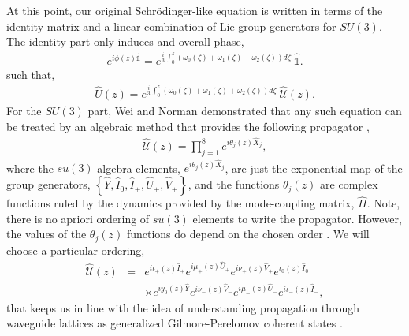 \documentclass[9pt,twocolumn,twoside]{osajnl}
\begin{document}
At this point, our original Schr\"odinger-like equation is written in terms of the identity matrix and a linear combination of Lie group generators for $SU(3)$.
The identity part only induces and overall phase,
\begin{eqnarray}
e^{i \phi(z) \hat{\mathbb{1}}} = e^{\frac{i}{3} \int_{0}^{z} \left(\omega_{0}(\zeta) + \omega_{1}(\zeta) + \omega_{2}(\zeta) \right) d\zeta } ~\hat{\mathbb{1}} .
\end{eqnarray}
such that,
\begin{eqnarray}
	\hat{U}(z) =  e^{ \frac{i}{3} \int_{0}^{z} ( \omega_{0}(\zeta) + \omega_{1}(\zeta) + \omega_{2}(\zeta) ) d\zeta} ~\hat{\mathcal{U}}(z).
\end{eqnarray}
For the $SU(3)$ part, Wei and Norman demonstrated that any such equation can be treated by an algebraic method that provides the following propagator \cite{Wei1963p575},
\begin{eqnarray}
	\hat{\mathcal{U}}(z) = \prod_{j=1}^{8} e^{i \theta_{j}(z) \hat{X}_{j}},
\end{eqnarray}
where the $su(3)$ algebra elements, $e^{i \theta_{j}(z) \hat{X}_{j}}$, are just the exponential map of the group generators, $\left\{ \hat{Y}, \hat{I}_{0}, \hat{I}_{\pm}, \hat{U}_{\pm}, \hat{V}_{\pm} \right\}$, and the functions $\theta_{j}(z)$ are complex functions ruled by the dynamics provided by the mode-coupling matrix, $\hat{H}$.
Note, there is no apriori ordering of $su(3)$ elements to write the propagator. 
However, the values of the $\theta_{j}(z)$ functions do depend on the chosen order \cite{Dattoli1987p1582,Dattoli1991p1247}.
We will choose a particular ordering,
\begin{eqnarray}
\hat{\mathcal{U}}(z) &=& e^{i \iota_{+}(z) \hat{I}_{+}} e^{i \mu_{+}(z) \hat{U}_{+}}  
e^{i \nu_{+}(z) \hat{V}_{+}} e^{ \iota_{0}(z) \hat{I}_{0}} \nonumber \\ 
&& \times e^{i y_{0}(z) \hat{Y}}  e^{i \nu_{-}(z) \hat{V}_{-}} e^{i \mu_{-}(z) \hat{U}_{-}} e^{i \iota_{-}(z) \hat{I}_{-}}, \label{eq:prop}
\end{eqnarray}
that keeps us in line with the idea of understanding propagation through waveguide lattices as generalized Gilmore-Perelomov coherent states \cite{VillanuevaVergara2015p}.
\end{document}
